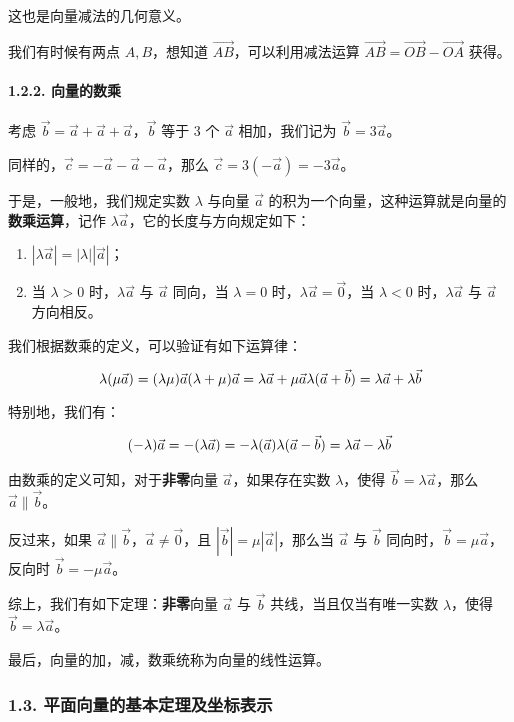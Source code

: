 这也是向量减法的几何意义。

我们有时候有两点 $A,B$，想知道 $\vec{AB}$，可以利用减法运算 $\vec{AB}=\vec{OB}-\vec{OA}$ 获得。

\paragraph{1.2.2. 向量的数乘}

考虑 $\vec b=\vec a+\vec a+\vec a$，$\vec b$ 等于 3 个 $\vec a$ 相加，我们记为 $\vec b=3\vec a$。

同样的，$\vec c=-\vec a-\vec a-\vec a$，那么 $\vec c=3(-\vec a)=-3\vec a$。

于是，一般地，我们规定实数 $\lambda$ 与向量 $\vec a$ 的积为一个向量，这种运算就是向量的\textbf{数乘运算}，记作 $\lambda \vec a$，它的长度与方向规定如下：

\begin{enumerate}
\item $|\lambda \vec a|=|\lambda||\vec a|$；
\item 当 $\lambda >0$ 时，$\lambda\vec a$ 与 $\vec a$ 同向，当 $\lambda =0$ 时，$\lambda \vec a=\vec 0$，当 $\lambda<0$ 时，$\lambda \vec a$ 与 $\vec a$ 方向相反。
\end{enumerate}

我们根据数乘的定义，可以验证有如下运算律：

$$
\lambda(\mu \vec a)=(\lambda \mu)\vec a\\
(\lambda+\mu)\vec a=\lambda \vec a+\mu \vec a\\
\lambda(\vec a+\vec b)=\lambda \vec a+\lambda \vec b
$$

特别地，我们有：

$$
(-\lambda)\vec a=-(\lambda \vec a)=-\lambda(\vec a)\\
\lambda(\vec a-\vec b)=\lambda \vec a-\lambda \vec b
$$

由数乘的定义可知，对于\textbf{非零}向量 $\vec a$，如果存在实数 $\lambda$，使得 $\vec b=\lambda \vec a$，那么 $\vec a \parallel \vec b$。

反过来，如果 $\vec a\parallel \vec b$，$\vec a \not = \vec 0$，且 $|\vec b|=\mu |\vec a|$，那么当 $\vec a$ 与 $\vec b$ 同向时，$\vec b=\mu \vec a$，反向时 $\vec b=-\mu \vec a$。

综上，我们有如下定理：\textbf{非零}向量 $\vec a$ 与 $\vec b$ 共线，当且仅当有唯一实数 $\lambda$，使得 $\vec b=\lambda \vec a$。

最后，向量的加，减，数乘统称为向量的线性运算。

\subsubsection{1.3. 平面向量的基本定理及坐标表示}

